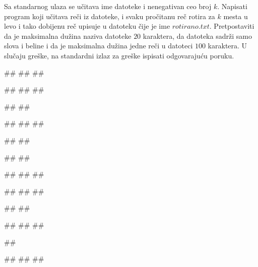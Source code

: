 \begin{Exercise}[label=p3_id18]         
Sa standarnog ulaza se učitava ime datoteke i nenegativan ceo
broj $k$. Napisati program koji učitava reči iz datoteke, i svaku pročitanu reč
rotira za $k$ mesta u levo i tako dobijenu reč upisuje u datoteku čije je ime $rotirano.txt$. 
Pretpostaviti da je maksimalna dužina naziva datoteke $20$ karaktera, da
datoteka sadrži samo slova i beline i da je maksimalna dužina jedne reči u datoteci $100$ karaktera.
U slučaju greške, na standardni izlaz za greške ispisati odgovarajuću poruku.

\begin{miditest}
\begin{upotreba}{1}
#\naslovInt#
##
##

##
##
##

##
##
\end{upotreba}
\end{miditest}
\begin{miditest}
\begin{upotreba}{2}
#\naslovInt#
##
##

##
##

##
##
\end{upotreba}
\end{miditest}

\begin{miditest}
\begin{upotreba}{3}
#\naslovInt#
##
##

##
##
##

##
##
\end{upotreba}
\end{miditest}
\begin{miditest}
\begin{upotreba}{4}
#\naslovInt#
##
##

##

#\naslovIzlazZaGresku#
##
##
\end{upotreba}
\end{miditest}
\end{Exercise}
\begin{Answer}[ref=p3_id18]
\end{Answer}

